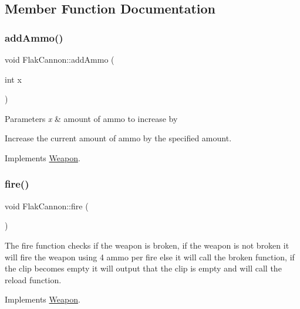 \subsection{Member Function Documentation}
\mbox{\label{classFlakCannon_a5aaac2916adb9a2e0364ba1476394780}} 
\subsubsection{\texorpdfstring{add\+Ammo()}{addAmmo()}}
{\footnotesize\ttfamily void Flak\+Cannon\+::add\+Ammo (\begin{DoxyParamCaption}\item[{int}]{x }\end{DoxyParamCaption})\hspace{0.3cm}{\ttfamily [virtual]}}


\begin{DoxyParams}{Parameters}
{\em x} & amount of ammo to increase by\\
\hline
\end{DoxyParams}
Increase the current amount of ammo by the specified amount. 

Implements \hyperlink{classWeapon}{Weapon}.

\mbox{\label{classFlakCannon_a0ff19970945d704d45a5f54fed499d68}} 
\subsubsection{\texorpdfstring{fire()}{fire()}}
{\footnotesize\ttfamily void Flak\+Cannon\+::fire (\begin{DoxyParamCaption}{ }\end{DoxyParamCaption})\hspace{0.3cm}{\ttfamily [virtual]}}

The fire function checks if the weapon is broken, if the weapon is not broken it will fire the weapon using 4 ammo per fire else it will call the broken function, if the clip becomes empty it will output that the clip is empty and will call the reload function. 

Implements \hyperlink{classWeapon}{Weapon}.

\mbox{\label{classFlakCannon_a0dc8a829f7115504f33be168bd5dfa53}} 
